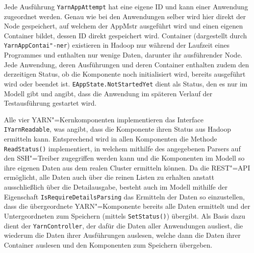 Jede Ausführung \texttt{YarnAppAttempt} hat eine eigene ID und kann einer Anwendung zugeordnet werden.
Genau wie bei den Anwendungen selber wird hier direkt der Node gespeichert, auf welchem der \ac{AppMstr} ausgeführt wird und einen eigenen Container bildet, dessen ID direkt gespeichert wird.
Container (dargestellt durch \texttt{YarnAppContai"-ner}) existieren in Hadoop nur während der Laufzeit eines Programmes und enthalten nur wenige Daten, darunter ihr ausführender Node.
Jede Anwendung, deren Ausführungen und deren Container enthalten zudem den derzeitigen Status, ob die Komponente noch initialisiert wird, bereits ausgeführt wird oder beendet ist.
\texttt{EAppState.NotStartedYet} dient als Status, den es nur im Modell gibt und angibt, dass die Anwendung im späteren Verlauf der Testausführung gestartet wird.

Alle vier YARN"=Kernkomponenten implementieren das Interface \texttt{IYarnReadable}, was angibt, dass die Komponente ihren Status aus Hadoop ermitteln kann.
Entsprechend wird in allen Komponenten die Methode \texttt{ReadStatus()} implementiert, in welchem mithilfe des angegebenen Parsers auf den SSH"=Treiber zugegriffen werden kann und die Komponenten im Modell so ihre eigenen Daten aus dem realen Cluster ermitteln können.
Da die REST"=API ermöglicht, alle Daten auch über die reinen Listen zu erhalten anstatt ausschließlich über die Detailausgabe, besteht auch im Modell mithilfe der Eigenschaft \texttt{IsRequireDetailsParsing} das Ermitteln der Daten so einzustellen, dass die übergeordnete YARN"=Komponente bereits alle Daten ermittelt und der Untergeordneten zum Speichern (mittels \texttt{SetStatus()}) übergibt.
Als Basis dazu dient der \texttt{YarnController}, der dafür die Daten aller Anwendungen ausliest, die wiederum die Daten ihrer Ausführungen auslesen, welche dann die Daten ihrer Container auslesen und den Komponenten zum Speichern übergeben.
